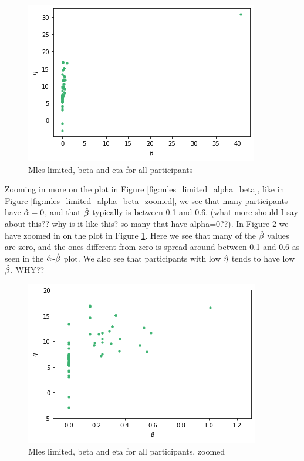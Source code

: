 \begin{figure}
    \centering
    \includegraphics[scale=0.7]{pictures/plotted_mles_limited_beta_eta_gk1.png}
    \caption{Mles limited, beta and eta for all participants}
    \label{fig:mles_limited_beta_eta}
\end{figure}
Zooming in more on the plot in Figure \ref{fig:mles_limited_alpha_beta}, like in Figure \ref{fig:mles_limited_alpha_beta_zoomed}, we see that many participants have $\hat{\alpha}=0$, and that $\hat{\beta}$ typically is between 0.1 and 0.6. (what more should I say about this?? why is it like this? so many that have alpha=0??). In Figure \ref{fig:mles_limited_beta_eta_zoomed} we have zoomed in on the plot in Figure \ref{fig:mles_limited_beta_eta}. Here we see that many of the $\hat{\beta}$ values are zero, and the ones different from zero is spread around between 0.1 and 0.6 as seen in the $\hat{\alpha}$-$\hat{\beta}$ plot. We also see that participants with low $\hat{\eta}$ tends to have low $\hat{\beta}$. WHY?? 

\begin{figure}
    \centering
    \includegraphics[scale=0.7]{pictures/plotted_mles_limited_beta_eta_zoomed_gk1.png}
    \caption{Mles limited, beta and eta for all participants, zoomed}
    \label{fig:mles_limited_beta_eta_zoomed}
\end{figure}


